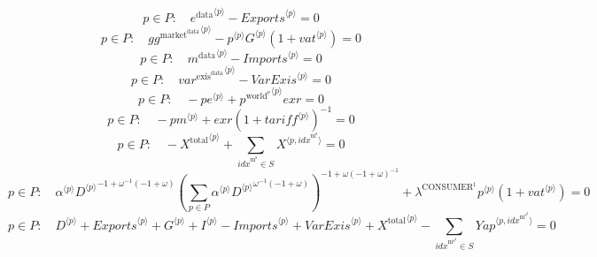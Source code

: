 \begin{equation}
p\in P\colon\quad {e^{\mathrm{data}}}^{\langle p\rangle} - {{E\!x\!p\!o\!r\!t\!s}}^{\langle p\rangle} = 0
\end{equation}
\begin{equation}
p\in P\colon\quad {{g\!g}^{\mathrm{market}^{\mathrm{data}}}}^{\langle p\rangle} - {{p}^{\langle p\rangle}} {{G}^{\langle p\rangle}} \left(1 + {{v\!a\!t}}^{\langle p\rangle}\right) = 0
\end{equation}
\begin{equation}
p\in P\colon\quad {m^{\mathrm{data}}}^{\langle p\rangle} - {{I\!m\!p\!o\!r\!t\!s}}^{\langle p\rangle} = 0
\end{equation}
\begin{equation}
p\in P\colon\quad {{v\!a\!r}^{\mathrm{exis}^{\mathrm{data}}}}^{\langle p\rangle} - {{V\!a\!r\!E\!x\!i\!s}}^{\langle p\rangle} = 0
\end{equation}
\begin{equation}
p\in P\colon\quad -{{p\!e}}^{\langle p\rangle} + {{p^{\mathrm{world}^{\mathrm{e}}}}^{\langle p\rangle}} {{e\!x\!r}} = 0
\end{equation}
\begin{equation}
p\in P\colon\quad -{{p\!m}}^{\langle p\rangle} + {{e\!x\!r}} \left(1 + {{t\!a\!r\!i\!f\!f}}^{\langle p\rangle}\right)^{-1} = 0
\end{equation}
\begin{equation}
p\in P\colon\quad -{X^{\mathrm{total}}}^{\langle p\rangle} + \sum_{{i\!d\!x}^{\mathrm{m}^{\mathrm{s}}}\in S} {X}^{\langle p,{i\!d\!x}^{\mathrm{m}^{\mathrm{s}}}\rangle} = 0
\end{equation}
\begin{equation}
p\in P\colon\quad {{\alpha}^{\langle p\rangle}} {{{D}^{\langle p\rangle}}^{-1 + {\omega}^{-1} \left(-1 + \omega\right)}} {\left(\sum_{p\in P} {{\alpha}^{\langle p\rangle}} {{{D}^{\langle p\rangle}}^{{\omega}^{-1} \left(-1 + \omega\right)}}\right)^{-1 + {\omega} \left(-1 + \omega\right)^{-1}}} + {\lambda^{\mathrm{CONSUMER}^{\mathrm{1}}}} {{p}^{\langle p\rangle}} \left(1 + {{v\!a\!t}}^{\langle p\rangle}\right) = 0
\end{equation}
\begin{equation}
p\in P\colon\quad {D}^{\langle p\rangle} + {{E\!x\!p\!o\!r\!t\!s}}^{\langle p\rangle} + {G}^{\langle p\rangle} + {I}^{\langle p\rangle} - {{I\!m\!p\!o\!r\!t\!s}}^{\langle p\rangle} + {{V\!a\!r\!E\!x\!i\!s}}^{\langle p\rangle} + {X^{\mathrm{total}}}^{\langle p\rangle} - \sum_{{i\!d\!x}^{\mathrm{m}^{\mathrm{s}^{\mathrm{2}}}}\in S} {{Y\!a\!p}}^{\langle p,{i\!d\!x}^{\mathrm{m}^{\mathrm{s}^{\mathrm{2}}}}\rangle} = 0
\end{equation}
